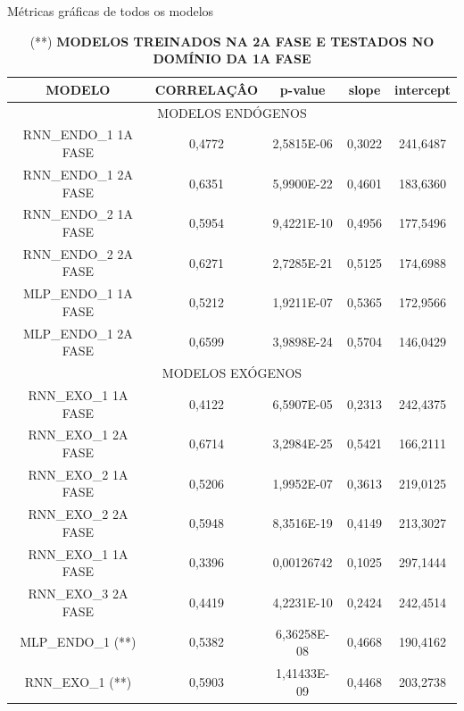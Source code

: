 \begin{table}[!ht]
        \caption{Métricas gráficas de todos os modelos}
        \begin{adjustbox}{width=\columnwidth,center}
           \begin{tabular}{ | c | c| c | c| c |}
     \rowcolor{gray!50}
   {	MODELO} & CORRELAÇÂO &	p-value &	slope & 	intercept\\ \hline
     \multicolumn{5}{c}{	MODELOS ENDÓGENOS }  \\ \hline
RNN\_ENDO\_1 1A FASE &	0,4772&		2,5815E-06&		0,3022&		241,6487 \\ \hline
RNN\_ENDO\_1 2A FASE&	0,6351&		5,9900E-22&		0,4601&		183,6360\\ \hline
RNN\_ENDO\_2 1A FASE&	0,5954&		9,4221E-10&		0,4956&		177,5496\\ \hline
RNN\_ENDO\_2 2A FASE&	0,6271&		2,7285E-21&		0,5125&		174,6988\\ \hline
MLP\_ENDO\_1 1A FASE&	0,5212&		1,9211E-07&		0,5365&		172,9566\\ \hline
MLP\_ENDO\_1 2A FASE&	0,6599&		3,9898E-24&		0,5704&		146,0429\\ \hline
	\multicolumn{5}{c}{ MODELOS EXÓGENOS }\\ \hline
RNN\_EXO\_1 1A FASE&	0,4122&		6,5907E-05&		0,2313&		242,4375 \\ \hline
RNN\_EXO\_1 2A FASE&	0,6714&		3,2984E-25&		0,5421&		166,2111 \\ \hline
RNN\_EXO\_2 1A FASE&	0,5206&		1,9952E-07&		0,3613&		219,0125 \\ \hline
RNN\_EXO\_2 2A FASE&	0,5948&		8,3516E-19&		0,4149&		213,3027 \\ \hline
RNN\_EXO\_1 1A FASE&	0,3396&		0,00126742&		0,1025&		297,1444 \\ \hline
RNN\_EXO\_3 2A FASE&	0,4419&		4,2231E-10&		0,2424&		242,4514 \\ \hline
MLP\_ENDO\_1 (**)&		0,5382&		6,36258E-08&	0,4668&		190,4162 \\ \hline
RNN\_EXO\_1  (**)&		0,5903&		1,41433E-09&	0,4468&		203,2738 \\ \hline
\end{tabular} \end{adjustbox} \caption*{(**) \textbf{MODELOS TREINADOS NA 2A FASE E TESTADOS NO DOMÍNIO DA 1A FASE}}\end{table} 